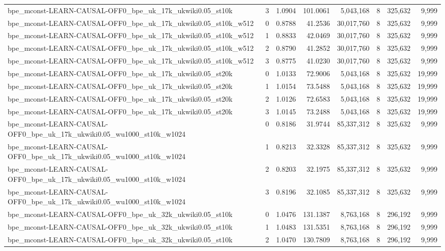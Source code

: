 \begin{tabular}{lrrrrrrr}
bpe\_mconst-LEARN-CAUSAL-OFF0\_bpe\_uk\_17k\_ukwiki0.05\_st10k & 3 & 1.0904 & 101.0061 & 5,043,168 & 8 & 325,632 & 9,999 \\
bpe\_mconst-LEARN-CAUSAL-OFF0\_bpe\_uk\_17k\_ukwiki0.05\_st10k\_w512 & 0 & 0.8788 & 41.2536 & 30,017,760 & 8 & 325,632 & 9,999 \\
bpe\_mconst-LEARN-CAUSAL-OFF0\_bpe\_uk\_17k\_ukwiki0.05\_st10k\_w512 & 1 & 0.8833 & 42.0469 & 30,017,760 & 8 & 325,632 & 9,999 \\
bpe\_mconst-LEARN-CAUSAL-OFF0\_bpe\_uk\_17k\_ukwiki0.05\_st10k\_w512 & 2 & 0.8790 & 41.2852 & 30,017,760 & 8 & 325,632 & 9,999 \\
bpe\_mconst-LEARN-CAUSAL-OFF0\_bpe\_uk\_17k\_ukwiki0.05\_st10k\_w512 & 3 & 0.8775 & 41.0230 & 30,017,760 & 8 & 325,632 & 9,999 \\
bpe\_mconst-LEARN-CAUSAL-OFF0\_bpe\_uk\_17k\_ukwiki0.05\_st20k & 0 & 1.0133 & 72.9006 & 5,043,168 & 8 & 325,632 & 19,999 \\
bpe\_mconst-LEARN-CAUSAL-OFF0\_bpe\_uk\_17k\_ukwiki0.05\_st20k & 1 & 1.0154 & 73.5488 & 5,043,168 & 8 & 325,632 & 19,999 \\
bpe\_mconst-LEARN-CAUSAL-OFF0\_bpe\_uk\_17k\_ukwiki0.05\_st20k & 2 & 1.0126 & 72.6583 & 5,043,168 & 8 & 325,632 & 19,999 \\
bpe\_mconst-LEARN-CAUSAL-OFF0\_bpe\_uk\_17k\_ukwiki0.05\_st20k & 3 & 1.0145 & 73.2488 & 5,043,168 & 8 & 325,632 & 19,999 \\
bpe\_mconst-LEARN-CAUSAL-OFF0\_bpe\_uk\_17k\_ukwiki0.05\_wu1000\_st10k\_w1024 & 0 & 0.8186 & 31.9744 & 85,337,312 & 8 & 325,632 & 9,999 \\
bpe\_mconst-LEARN-CAUSAL-OFF0\_bpe\_uk\_17k\_ukwiki0.05\_wu1000\_st10k\_w1024 & 1 & 0.8213 & 32.3328 & 85,337,312 & 8 & 325,632 & 9,999 \\
bpe\_mconst-LEARN-CAUSAL-OFF0\_bpe\_uk\_17k\_ukwiki0.05\_wu1000\_st10k\_w1024 & 2 & 0.8203 & 32.1975 & 85,337,312 & 8 & 325,632 & 9,999 \\
bpe\_mconst-LEARN-CAUSAL-OFF0\_bpe\_uk\_17k\_ukwiki0.05\_wu1000\_st10k\_w1024 & 3 & 0.8196 & 32.1085 & 85,337,312 & 8 & 325,632 & 9,999 \\
bpe\_mconst-LEARN-CAUSAL-OFF0\_bpe\_uk\_32k\_ukwiki0.05\_st10k & 0 & 1.0476 & 131.1387 & 8,763,168 & 8 & 296,192 & 9,999 \\
bpe\_mconst-LEARN-CAUSAL-OFF0\_bpe\_uk\_32k\_ukwiki0.05\_st10k & 1 & 1.0483 & 131.5351 & 8,763,168 & 8 & 296,192 & 9,999 \\
bpe\_mconst-LEARN-CAUSAL-OFF0\_bpe\_uk\_32k\_ukwiki0.05\_st10k & 2 & 1.0470 & 130.7809 & 8,763,168 & 8 & 296,192 & 9,999 \\

\end{tabular}
